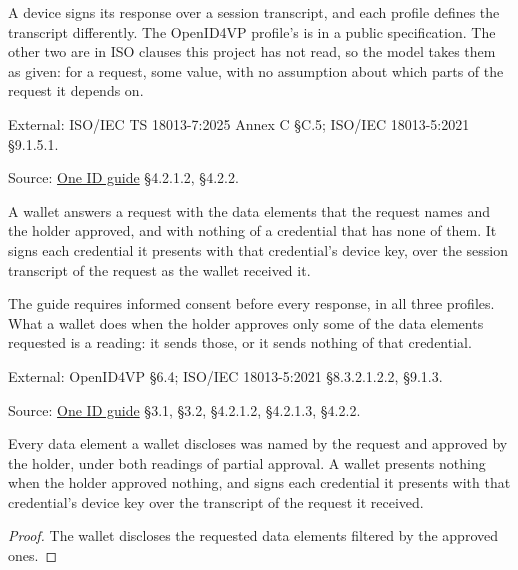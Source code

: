 \begin{definition}
  \label{def:session-transcript}
  A device signs its response over a session transcript, and each profile
  defines the transcript differently.  The OpenID4VP profile's is in a public
  specification.  The other two are in ISO clauses this project has not read,
  so the model takes them as given: for a request, some value, with no
  assumption about which parts of the request it depends on.

  External: ISO/IEC TS 18013-7:2025 Annex C §C.5; ISO/IEC 18013-5:2021
  §9.1.5.1.

  Source: \href{https://standards.atlassian.net/wiki/spaces/OneID/pages/2947416082/Technical+Implementation+Guide}{One ID guide} §4.2.1.2, §4.2.2.
\end{definition}

\begin{definition}
  \label{def:wallet-respond}
  A wallet answers a request with the data elements that the request names and
  the holder approved, and with nothing of a credential that has none of them.
  It signs each credential it presents with that credential's device key, over
  the session transcript of the request as the wallet received it.

  The guide requires informed consent before every response, in all three
  profiles.  What a wallet does when the holder approves only some of the data
  elements requested is a reading: it sends those, or it sends nothing of that
  credential.

  External: OpenID4VP §6.4; ISO/IEC 18013-5:2021 §8.3.2.1.2.2, §9.1.3.

  Source: \href{https://standards.atlassian.net/wiki/spaces/OneID/pages/2947416082/Technical+Implementation+Guide}{One ID guide} §3.1, §3.2, §4.2.1.2, §4.2.1.3, §4.2.2.
\end{definition}

\begin{theorem}
  \label{thm:wallet-discloses}
  Every data element a wallet discloses was named by the request and approved
  by the holder, under both readings of partial approval.  A wallet presents
  nothing when the holder approved nothing, and signs each credential it
  presents with that credential's device key over the transcript of the request
  it received.
\end{theorem}
\begin{proof}
  The wallet discloses the requested data elements filtered by the approved ones.
\end{proof}

